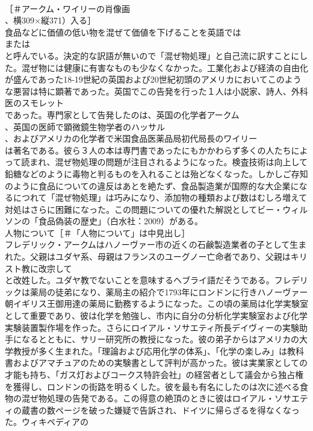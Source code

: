 \documentclass[8pt]{extreport}
\begin{document}
\begin{CJK}{UTF8}{min}
\\	［＃アークム・ワイリーの肖像画
\\	、横309×縦371）入る］
\\	食品などに価値の低い物を混ぜて価値を下げることを英語では 
\\	または 
\\	と呼んでいる。決定的な訳語が無いので「混ぜ物処理」と自己流に訳すことにした。混ぜ物には健康に有害なものも少なくなかった。工業化および経済の自由化が盛んであった18-19世紀の英国および20世紀初頭のアメリカにおいてこのような悪習は特に顕著であった。英国でこの告発を行った１人は小説家、詩人、外科医のスモレット
\\	であった。専門家として告発したのは、英国の化学者アークム
\\	、英国の医師で顕微鏡生物学者のハッサル
\\	、およびアメリカの化学者で米国食品医薬品局初代局長のワイリー
\\	は著名である。彼ら３人の本は専門書であったにもかかわらず多くの人たちによって読まれ、混ぜ物処理の問題が注目されるようになった。検査技術は向上して鉛糖などのように毒物と判るものを入れることは殆どなくなった。しかしご存知のように食品についての違反はあとを絶たず、食品製造業が国際的な大企業になるにつれて「混ぜ物処理」は巧みになり、添加物の種類および数はむしろ増えて対処はさらに困難になった。この問題についての優れた解説としてビー・ウィルソンの「食品偽装の歴史」（白水社：2009）がある。
\\	人物について［＃「人物について」は中見出し］
\\	フレデリック・アークムはハノーヴァー市の近くの石鹸製造業者の子として生まれた。父親はユダヤ系、母親はフランスのユーグノー亡命者であり、父親はキリスト教に改宗して 
\\	と改姓した。ユダヤ教でないことを意味するヘブライ語だそうである。フレデリックは薬局の徒弟になり、薬局主の紹介で1793年にロンドンに行きハノーヴァー朝イギリス王御用達の薬局に勤務するようになった。この頃の薬局は化学実験室として重要であり、彼は化学を勉強し、市内に自分の分析化学実験室および化学実験装置製作場を作った。さらにロイアル・ソサエティ所長デイヴィーの実験助手になるとともに、サリー研究所の教授になった。彼の弟子からはアメリカの大学教授が多く生まれた。「理論および応用化学の体系」、「化学の楽しみ」は教科書およびアマチュアのための実験書として評判が高かった。彼は実業家としての才能も持ち、「ガス灯およびコークス特許会社」の経営者として議会から独占権を獲得し、ロンドンの街路を明るくした。彼を最も有名にしたのは次に述べる食物の混ぜ物処理の告発である。この得意の絶頂のときに彼はロイアル・ソサエティの蔵書の数ページを破った嫌疑で告訴され、ドイツに帰らざるを得なくなった。ウィキペディアの 

\end{CJK}
\end{document}
